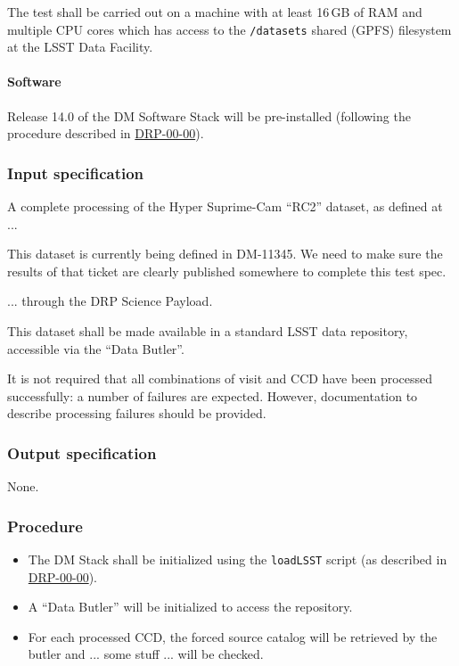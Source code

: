 The test shall be carried out on a machine with at least 16\,GB of RAM and
multiple CPU cores which has access to the \texttt{/datasets} shared (GPFS)
filesystem at the LSST Data Facility.

\paragraph{Software}

Release 14.0 of the DM Software Stack will be pre-installed (following the
procedure described in \hyperref[drp-00-00]{DRP-00-00}).

\subsubsection{Input specification}

A complete processing of the Hyper Suprime-Cam ``RC2'' dataset, as defined
at ...

\begin{note}
This dataset is currently being defined in DM-11345. We need to make sure the
results of that ticket are clearly published somewhere to complete this test
spec.

\end{note}

... through the DRP Science Payload.

This dataset shall be made available in a standard LSST data repository,
accessible via the ``Data Butler''.

It is not required that all combinations of visit and CCD have been processed
successfully: a number of failures are expected. However, documentation to
describe processing failures should be provided.

\subsubsection{Output specification}

None.

\subsubsection{Procedure}

\begin{itemize}

  \item{The DM Stack shall be initialized using the \texttt{loadLSST} script
  (as described in \hyperref[drp-00-00]{DRP-00-00}).}

  \item{A ``Data Butler'' will be initialized to access the repository.}

  \item{For each processed CCD, the forced source catalog will be retrieved by
  the butler and ... some stuff ... will be checked.}

\end{itemize}
